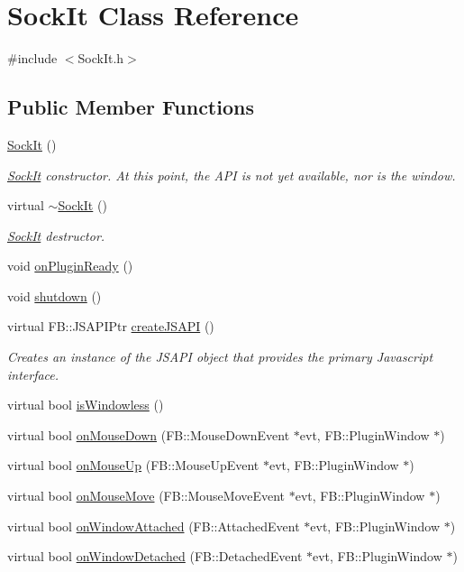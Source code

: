 \hypertarget{classSockIt}{
\section{SockIt Class Reference}
\label{classSockIt}
}


{\ttfamily \#include $<$SockIt.h$>$}

\subsection*{Public Member Functions}
\begin{DoxyCompactItemize}
\item 
\hyperlink{classSockIt_a6ca1ecc74ae75bff556469cbaca25338}{SockIt} ()
\begin{DoxyCompactList}\small\item\em \hyperlink{classSockIt}{SockIt} constructor. At this point, the API is not yet available, nor is the window. \item\end{DoxyCompactList}\item 
virtual \hyperlink{classSockIt_abcd992a7c2848219c90f29241573a888}{$\sim$SockIt} ()
\begin{DoxyCompactList}\small\item\em \hyperlink{classSockIt}{SockIt} destructor. \item\end{DoxyCompactList}\item 
void \hyperlink{classSockIt_a0ea0da80aff982c421b9dbfa6defc31c}{onPluginReady} ()
\item 
void \hyperlink{classSockIt_af0500187342aa036ba2e9523519f1bed}{shutdown} ()
\item 
virtual FB::JSAPIPtr \hyperlink{classSockIt_a57db1748067287ab0bbc7a096aea8b0b}{createJSAPI} ()
\begin{DoxyCompactList}\small\item\em Creates an instance of the JSAPI object that provides the primary Javascript interface. \item\end{DoxyCompactList}\item 
virtual bool \hyperlink{classSockIt_ad8d0e6627e76f817962f6ec902d86a7e}{isWindowless} ()
\item 
virtual bool \hyperlink{classSockIt_a2224da519bcf7a29c6c26f06c3c830d9}{onMouseDown} (FB::MouseDownEvent $\ast$evt, FB::PluginWindow $\ast$)
\item 
virtual bool \hyperlink{classSockIt_acadbe6be131043cbbcfdc70a672d08d6}{onMouseUp} (FB::MouseUpEvent $\ast$evt, FB::PluginWindow $\ast$)
\item 
virtual bool \hyperlink{classSockIt_aaf869ea6c09a62ecb56ad945ac12e798}{onMouseMove} (FB::MouseMoveEvent $\ast$evt, FB::PluginWindow $\ast$)
\item 
virtual bool \hyperlink{classSockIt_a0334a13dbb896d947679f3fb5e85e347}{onWindowAttached} (FB::AttachedEvent $\ast$evt, FB::PluginWindow $\ast$)
\item 
virtual bool \hyperlink{classSockIt_a87f4e33d21c1dd771b93b3fa595c13d1}{onWindowDetached} (FB::DetachedEvent $\ast$evt, FB::PluginWindow $\ast$)
\end{DoxyCompactItemize}

